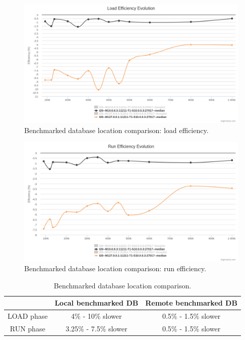 \documentclass[a4paper,11pt]{report}
\begin{document}
\begin{figure}[ht]
\begin{center}
\includegraphics[width=1\linewidth]{images/evaluation/benchmarked-T1-Sremote-load.png}
\caption{Benchmarked database location comparison: load efficiency.}
\label{benchmarked-T1-Sremote-load}
\end{center}
\end{figure}

\begin{figure}[ht]
\begin{center}
\includegraphics[width=1\linewidth]{images/evaluation/benchmarked-T1-Sremote-run.png}
\caption{Benchmarked database location comparison: run efficiency.}
\label{benchmarked-T1-Sremote-run}
\end{center}
\end{figure}

\begin{table}[ht]
\begin{center}
	\begin{tabular}{|c|c|c|}
		\hline
		  & Local benchmarked DB & Remote benchmarked DB \\
		\hline
	   	LOAD phase & 4\% - 10\% slower & 0.5\% - 1.5\% slower \\
	   	RUN phase & 3.25\% - 7.5\% slower & 0.5\% - 1.5\% slower \\
	    \hline
	\end{tabular}
	\caption{Benchmarked database location comparison.}
\label{benchmarked-table}
\end{center}
\end{table}
\end{document}
